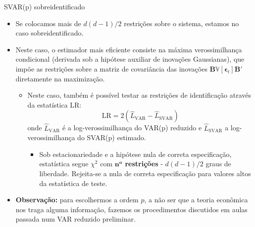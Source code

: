 \documentclass[11pt]{beamer}
\begin{document}
\begin{frame}{SVAR(p) sobreidentificado}
	\begin{itemize}
		\item Se colocamos mais de $d(d-1)/2$ restrições sobre o sistema, estamos no caso {\color{blue}sobreidentificado}.
		
		\item Neste caso, o estimador mais eficiente consiste na máxima verossimilhança condicional (derivada sob a hipótese auxiliar de inovações Gaussianas), que impõe as restrições sobre a matriz de covariância das inovações $\boldsymbol{B}\mathbb{V}[\boldsymbol{\epsilon}_t]\boldsymbol{B}'$ diretamente na maximização.
				\begin{itemize}
		\item Neste caso, também é possível testar as restrições de identificação através da estatística LR:
		$$\text{LR} = 2(\hat{L}_{\text{VAR}} - \hat{L}_{\text{SVAR}})$$
		onde $\hat{L}_{\text{VAR}}$ é a log-verossimilhança do VAR(p) reduzido e $\hat{L}_{\text{SVAR}}$ a log-verossimilhança do SVAR(p) estimado.
		\begin{itemize}
			\item Sob estacionariedade e a hipótese nula de correta especificação, estatística segue $\chi^2$ com \textbf{$\boldsymbol{n^o}$ restrições} - $d(d-1)/2$ graus de liberdade. Rejeita-se a nula de correta especificação para valores altos da estatística de teste.
		\end{itemize}
				\end{itemize}
		\item \textbf{Observação:} para escolhermos a ordem $p$, a não ser que a teoria econômica nos traga alguma informação, fazemos os procedimentos discutidos em aulas passada {\color{red}num VAR reduzido preliminar}.
	\end{itemize}
\end{frame}
\end{document}
